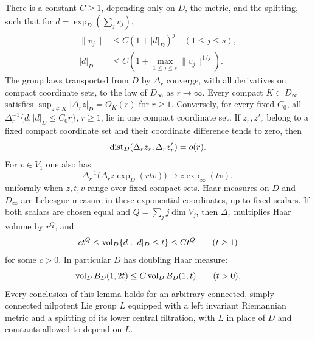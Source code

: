 \begin{lemma}\label{lem:d-scaling}
There is a constant $C\ge1$, depending only on $D$, the metric, and the
splitting, such that for $d=\exp_D(\sum_jv_j)$,
\begin{align}
 \|v_j\|&\le C(1+|d|_D)^j \quad(1\le j\le s),
       \label{eq:d-coordinate-upper}\\
 |d|_D&\le C\left(1+\max_{1\le j\le s}\|v_j\|^{1/j}\right).
       \label{eq:d-coordinate-reverse}
\end{align}
The group laws transported from $D$ by $\Delta_r$ converge, with all
derivatives on compact coordinate sets, to the law of $D_\infty$ as
$r\to\infty$.  Every compact $K\subset D_\infty$ satisfies
$\sup_{z\in K}|\Delta_r z|_D=O_K(r)$ for $r\ge1$.
Conversely, for every fixed $C_0$, all
$\Delta_r^{-1}\{d:|d|_D\le C_0r\}$, $r\ge1$, lie in one compact
coordinate set.
If $z_r,z'_r$ belong to a fixed compact coordinate set and their coordinate
difference tends to zero, then
\begin{equation}\label{eq:d-scaling-equicontinuity}
 \operatorname{dist}_D(\Delta_r z_r,\Delta_r z'_r)=o(r).
\end{equation}
For $v\in V_1$ one also has
\begin{equation}\label{eq:d-horizontal-flow-limit}
 \Delta_r^{-1}\bigl(\Delta_r z\exp_D(rt v)\bigr)
     \longrightarrow z\exp_\infty(tv),
\end{equation}
uniformly when $z,t,v$ range over fixed compact sets.
Haar measures on $D$ and $D_\infty$ are Lebesgue measure in these
exponential coordinates, up to fixed scalars.  If both scalars are
chosen equal and $Q=\sum_jj\dim V_j$, then $\Delta_r$ multiplies Haar
volume by $r^Q$, and
\begin{equation}\label{eq:d-polynomial-volume}
 c t^Q\le \operatorname{vol}_D\{d:|d|_D\le t\}\le C t^Q \qquad(t\ge1)
\end{equation}
for some $c>0$.  In particular $D$ has doubling Haar measure:
\begin{equation}\label{eq:nilpotent-doubling}
 \operatorname{vol}_D B_D(1,2t)\le C\operatorname{vol}_D B_D(1,t)\qquad(t>0).
\end{equation}
Every conclusion of this lemma holds for an arbitrary connected,
simply connected nilpotent Lie group $L$ equipped with a left invariant
Riemannian metric and a splitting of its lower central filtration,
with $L$ in place of $D$ and constants allowed to depend on $L$.
\end{lemma}

